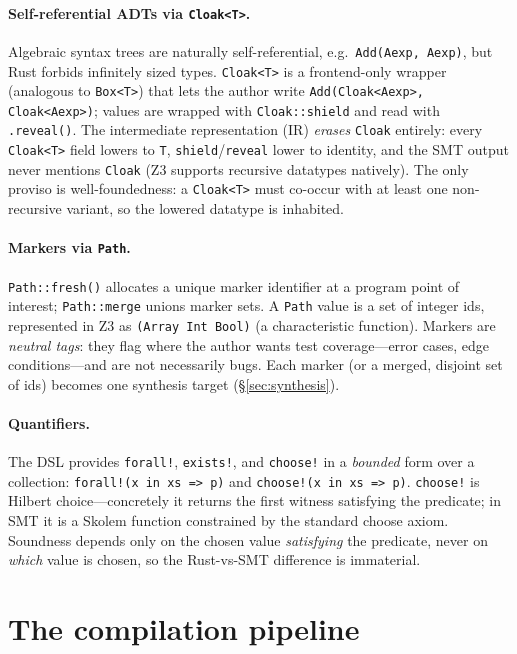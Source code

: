 \documentclass[11pt,a4paper]{article}
\theoremstyle{definition}
\theoremstyle{remark}
\newcommand{\code}[1]{\texttt{#1}}
\begin{document}
\paragraph{Self-referential ADTs via \code{Cloak<T>}.}
Algebraic syntax trees are naturally self-referential, e.g.\ \code{Add(Aexp,
Aexp)}, but Rust forbids infinitely sized types. \code{Cloak<T>} is a
frontend-only wrapper (analogous to \code{Box<T>}) that lets the author write
\code{Add(Cloak<Aexp>, Cloak<Aexp>)}; values are wrapped with
\code{Cloak::shield} and read with \code{.reveal()}. The intermediate
representation (IR) \emph{erases} \code{Cloak} entirely: every \code{Cloak<T>}
field lowers to \code{T}, \code{shield}/\code{reveal} lower to identity, and the
SMT output never mentions \code{Cloak} (Z3 supports recursive datatypes
natively). The only proviso is well-foundedness: a \code{Cloak<T>} must co-occur
with at least one non-recursive variant, so the lowered datatype is inhabited.

\paragraph{Markers via \code{Path}.}
\code{Path::fresh()} allocates a unique marker identifier at a program point of
interest; \code{Path::merge} unions marker sets. A \code{Path} value is a set of
integer ids, represented in Z3 as \code{(Array Int Bool)} (a characteristic
function). Markers are \emph{neutral tags}: they flag where the author wants test
coverage---error cases, edge conditions---and are not necessarily bugs. Each
marker (or a merged, disjoint set of ids) becomes one synthesis target
(\S\ref{sec:synthesis}).

\paragraph{Quantifiers.}
The DSL provides \code{forall!}, \code{exists!}, and \code{choose!} in a
\emph{bounded} form over a collection: \code{forall!(x in xs => p)} and
\code{choose!(x in xs => p)}. \code{choose!} is Hilbert choice---concretely it
returns the first witness satisfying the predicate; in SMT it is a Skolem
function constrained by the standard choose axiom. Soundness depends only on
the chosen value \emph{satisfying} the predicate, never on \emph{which} value is
chosen, so the Rust-vs-SMT difference is immaterial.

\section{The compilation pipeline}
\label{sec:pipeline}
\end{document}
